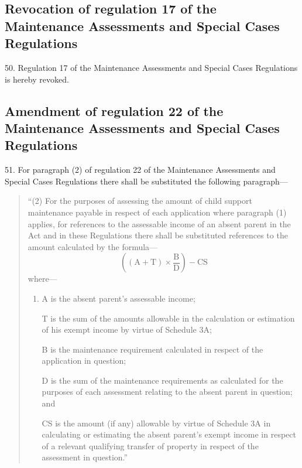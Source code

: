 \documentclass[a4paper]{article}
\begin{document}
\subsection[50. Revocation of regulation 17 of the Maintenance Assessments and Special Cases Regulations]{Revocation of regulation 17 of the Maintenance Assessments and Special Cases Regulations}

50.  Regulation 17 of the Maintenance Assessments and Special Cases Regulations is hereby revoked.

\subsection[51. Amendment of regulation 22 of the Maintenance Assessments and Special Cases Regulations]{Amendment of regulation 22 of the Maintenance Assessments and Special Cases Regulations}

51.  For paragraph (2) of regulation 22 of the Maintenance Assessments and Special Cases Regulations there shall be substituted the following paragraph—
\begin{quotation}
“(2) For the purposes of assessing the amount of child support maintenance payable in respect of each application where paragraph (1) applies, for references to the assessable income of an absent parent in the Act and in these Regulations there shall be substituted references to the amount calculated by the formula—
\[ \left( (\mathrm{A} + \mathrm{T}) \times \frac{\mathrm{B}}{\mathrm{D}}\right) - \mathrm{CS}\]
where—
\begin{enumerate}\item[]
A is the absent parent’s assessable income;

T is the sum of the amounts allowable in the calculation or estimation of his exempt income by virtue of Schedule 3A;

B is the maintenance requirement calculated in respect of the application in question;

D is the sum of the maintenance requirements as calculated for the purposes of each assessment relating to the absent parent in question; and

CS is the amount (if any) allowable by virtue of Schedule 3A in calculating or estimating the absent parent’s exempt income in respect of a relevant qualifying transfer of property in respect of the assessment in question.”
\end{enumerate}
\end{quotation}
\end{document}
